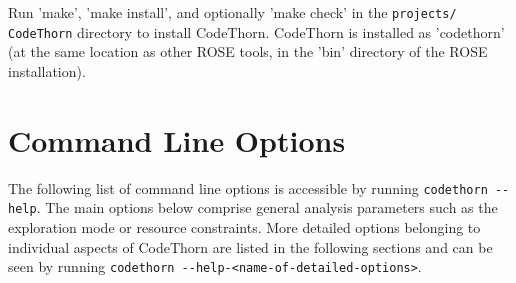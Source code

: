 \documentclass[natbib]{article}
\begin{document}
Run 'make', 'make install', and optionally 'make check' in the
\verb+projects/+ \verb+CodeThorn+ directory to install CodeThorn. CodeThorn is
installed as 'codethorn' (at the same location as other ROSE tools, in
the 'bin' directory of the ROSE installation).

\section{Command Line Options}
The following list of command line options is accessible by running \verb+codethorn --help+.
The main options below comprise general analysis parameters such as the exploration mode or resource constraints.
More detailed options belonging to individual aspects of CodeThorn are listed in the following sections and can be
seen by running \verb+codethorn --help-<name-of-detailed-options>+. 
\end{document}
